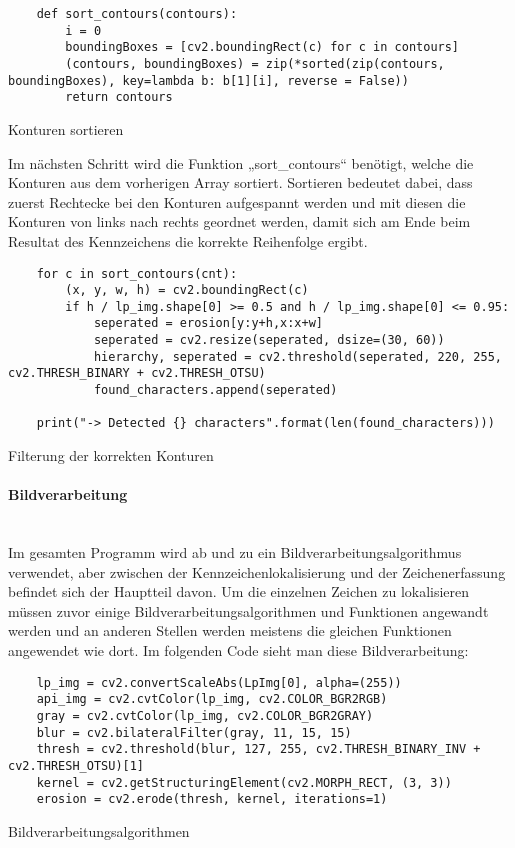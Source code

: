\begin{listing}[H]
    \begin{verbatim}
    def sort_contours(contours):
        i = 0
        boundingBoxes = [cv2.boundingRect(c) for c in contours]
        (contours, boundingBoxes) = zip(*sorted(zip(contours, boundingBoxes), key=lambda b: b[1][i], reverse = False))
        return contours
    \end{verbatim}
    \caption{Konturen sortieren}
\end{listing}

Im nächsten Schritt wird die Funktion „sort{\_}contours“ benötigt, welche die Konturen aus dem vorherigen Array sortiert. Sortieren bedeutet dabei, 
dass zuerst Rechtecke bei den Konturen aufgespannt werden und mit diesen die Konturen von links nach rechts geordnet werden, damit sich am Ende beim Resultat 
des Kennzeichens die korrekte Reihenfolge ergibt.

\begin{listing}[H]
    \begin{verbatim}
    for c in sort_contours(cnt):
        (x, y, w, h) = cv2.boundingRect(c)
        if h / lp_img.shape[0] >= 0.5 and h / lp_img.shape[0] <= 0.95: 
            seperated = erosion[y:y+h,x:x+w]
            seperated = cv2.resize(seperated, dsize=(30, 60))
            hierarchy, seperated = cv2.threshold(seperated, 220, 255, cv2.THRESH_BINARY + cv2.THRESH_OTSU)
            found_characters.append(seperated)

    print("-> Detected {} characters".format(len(found_characters)))
    \end{verbatim}
    \caption{Filterung der korrekten Konturen}
\end{listing}

\paragraph{Bildverarbeitung}\mbox{}\\

Im gesamten Programm wird ab und zu ein Bildverarbeitungsalgorithmus verwendet, aber zwischen der Kennzeichenlokalisierung und der Zeichenerfassung befindet 
sich der Hauptteil davon. Um die einzelnen Zeichen zu lokalisieren müssen zuvor einige Bildverarbeitungsalgorithmen und Funktionen angewandt werden und 
an anderen Stellen werden meistens die gleichen Funktionen angewendet wie dort. Im folgenden Code sieht man diese Bildverarbeitung:

\begin{listing}[H]
    \begin{verbatim}
    lp_img = cv2.convertScaleAbs(LpImg[0], alpha=(255))
    api_img = cv2.cvtColor(lp_img, cv2.COLOR_BGR2RGB)
    gray = cv2.cvtColor(lp_img, cv2.COLOR_BGR2GRAY)
    blur = cv2.bilateralFilter(gray, 11, 15, 15)
    thresh = cv2.threshold(blur, 127, 255, cv2.THRESH_BINARY_INV + cv2.THRESH_OTSU)[1]
    kernel = cv2.getStructuringElement(cv2.MORPH_RECT, (3, 3))
    erosion = cv2.erode(thresh, kernel, iterations=1)
    \end{verbatim}
    \caption{Bildverarbeitungsalgorithmen}
\end{listing}

